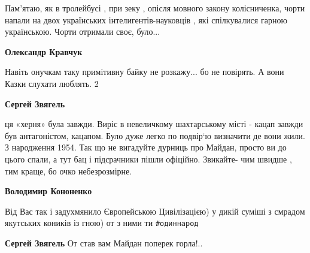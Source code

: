 \begin{itemize}
\begin{itemize}
Пам'ятаю, як в тролейбусі , при зеку , опісля мовного закону колісниченка,
чорти напали на двох українських інтелигентів-науковців , які спілкувалися
гарною українською. Чорти отримали своє, було...


 
\textbf{Олександр Кравчук} 

Навіть онучкам таку примітивну байку не розкажу... бо не повірять. А вони Казки
слухати люблять. 2

 
\textbf{Сергей Звягель} 

ця «херня» була завжди. Виріс в невеличкому шахтарському місті - кацап завжди
був антагоністом, кацапом. Було дуже легко по подвір‘ю визначити де вони жили.
З народження 1954. Так що не вигадуйте дурниць про Майдан, просто ви до цього
спали, а тут бац і підсрачники пішли офіційно. Звикайте- чим швидше , тим
краще, бо очко небезрозмірне.


 
\textbf{Володимир Кононенко} 

Від Вас так і задухмянило Європейською Цивілізацією) у дикій суміші з смрадом
якутських коників із гною) от з ними ти \verb|#одиннарод|

 
\textbf{Сергей Звягель} От став вам Майдан поперек горла!..

 

\end{itemize}
\end{itemize}
